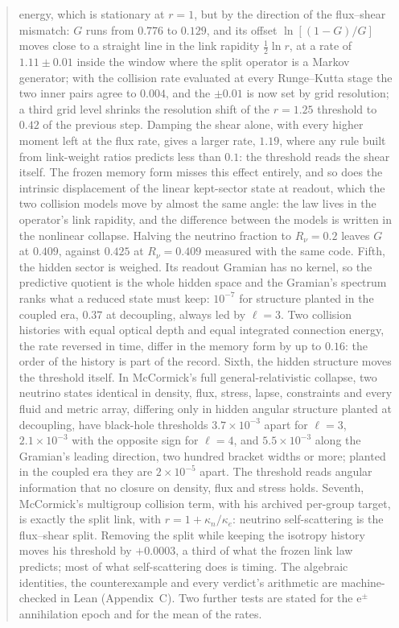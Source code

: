 \documentclass[11pt]{article}
\begin{document}
\begin{abstract}
energy, which is stationary at $r=1$, but by the direction of the flux--shear mismatch: $G$ runs from $0.776$ to $0.129$, and its offset $\ln[(1-G)/G]$ moves close to a straight line in the link rapidity $\tfrac12\ln r$, at a rate of $1.11\pm0.01$ inside the window where the split operator is a Markov generator; with the collision rate evaluated at every Runge--Kutta stage the two inner pairs agree to $0.004$, and the $\pm0.01$ is now set by grid resolution; a third grid level shrinks the resolution shift of the $r=1.25$ threshold to $0.42$ of the previous step. Damping the shear alone, with every higher moment left at the flux rate, gives a larger rate, $1.19$, where any rule built from link-weight ratios predicts less than $0.1$: the threshold reads the shear itself. The frozen memory form misses this effect entirely, and so does the intrinsic displacement of the linear kept-sector state at readout, which the two collision models move by almost the same angle: the law lives in the operator's link rapidity, and the difference between the models is written in the nonlinear collapse. Halving the neutrino fraction to $R_\nu=0.2$ leaves $G$ at $0.409$, against $0.425$ at $R_\nu=0.409$ measured with the same code. Fifth, the hidden sector is weighed. Its readout Gramian has no kernel, so the predictive quotient is the whole hidden space and the Gramian's spectrum ranks what a reduced state must keep: $10^{-7}$ for structure planted in the coupled era, $0.37$ at decoupling, always led by $\ell=3$. Two collision histories with equal optical depth and equal integrated connection energy, the rate reversed in time, differ in the memory form by up to $0.16$: the order of the history is part of the record. Sixth, the hidden structure moves the threshold itself. In McCormick's full general-relativistic collapse, two neutrino states identical in density, flux, stress, lapse, constraints and every fluid and metric array, differing only in hidden angular structure planted at decoupling, have black-hole thresholds $3.7\times10^{-3}$ apart for $\ell=3$, $2.1\times10^{-3}$ with the opposite sign for $\ell=4$, and $5.5\times10^{-3}$ along the Gramian's leading direction, two hundred bracket widths or more; planted in the coupled era they are $2\times10^{-5}$ apart. The threshold reads angular information that no closure on density, flux and stress holds. Seventh, McCormick's multigroup collision term, with his archived per-group target, is exactly the split link, with $r=1+\kappa_n/\kappa_e$: neutrino self-scattering is the flux--shear split. Removing the split while keeping the isotropy history moves his threshold by $+0.0003$, a third of what the frozen link law predicts; most of what self-scattering does is timing. The algebraic identities, the counterexample and every verdict's arithmetic are machine-checked in Lean (Appendix~C). Two further tests are stated for the e$^\pm$ annihilation epoch and for the mean of the rates.
\end{abstract}
\end{document}
